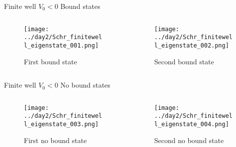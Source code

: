 \documentclass[aspectratio=169]{beamer}
\begin{document}
\begin{frame}{Finite well $V_0 < 0$}
    Bound states
    \begin{columns}
        \begin{column}{0.5\textwidth}
            \centering 
            \begin{figure}
            \texttt{[image: ../day2/Schr\_finitewell\_eigenstate\_001.png]} \\
            \caption{First bound state} 
            \end{figure}
        \end{column}

        \begin{column}{0.5\textwidth}
            \centering 
            \begin{figure}
            \texttt{[image: ../day2/Schr\_finitewell\_eigenstate\_002.png]} \\
            \caption{Second bound state} 
            \end{figure}
        \end{column}
    \end{columns}
\end{frame}

\begin{frame}{Finite well $V_0 < 0$}
    No bound states
    \begin{columns}
        \begin{column}{0.5\textwidth}
            \centering 
            \begin{figure}
            \texttt{[image: ../day2/Schr\_finitewell\_eigenstate\_003.png]} \\
            \caption{First no bound state} 
            \end{figure}
        \end{column}

        \begin{column}{0.5\textwidth}
            \centering 
            \begin{figure}
            \texttt{[image: ../day2/Schr\_finitewell\_eigenstate\_004.png]} \\
            \caption{Second no bound state} 
            \end{figure}
        \end{column}
    \end{columns}
\end{frame}
\end{document}
